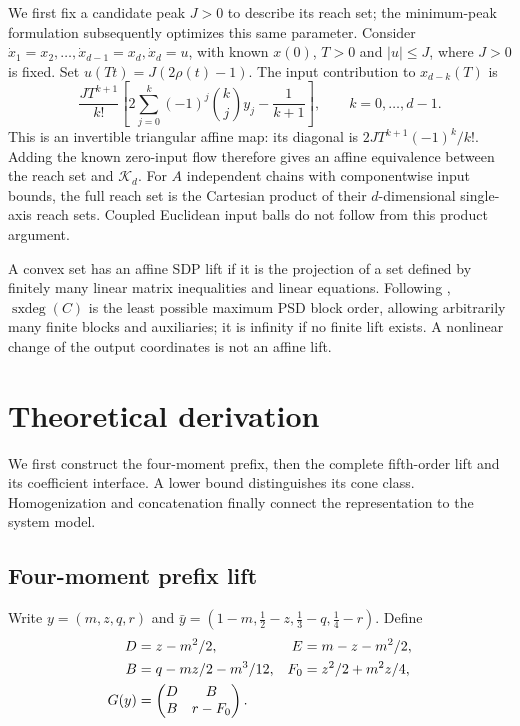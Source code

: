 \documentclass[pdflatex,sn-mathphys-num]{sn-jnl}
\theoremstyle{thmstyleone}
\theoremstyle{thmstyletwo}\newtheorem{remark}[theorem]{Remark}
\newcommand{\K}{\mathcal K}
\newcommand{\sxdeg}{\operatorname{sxdeg}}
\begin{document}
We first fix a candidate peak $J>0$ to describe its reach set; the
minimum-peak formulation subsequently optimizes this same parameter.
Consider $\dot x_1=x_2,\ldots,\dot x_{d-1}=x_d,\dot x_d=u$,
with known $x(0)$, $T>0$ and $|u|\le J$, where $J>0$ is fixed.
Set $u(Tt)=J(2\rho(t)-1)$. The input contribution to $x_{d-k}(T)$ is
\begin{equation}\label{eq:affine}
 \frac{JT^{k+1}}{k!}\left[
 2\sum_{j=0}^k(-1)^j\binom{k}{j}y_j-\frac1{k+1}\right],
 \qquad k=0,\ldots,d-1.
\end{equation}
This is an invertible triangular affine map: its diagonal is
$2JT^{k+1}(-1)^k/k!$. Adding the known zero-input flow therefore gives an
affine equivalence between the reach set and $\K_d$. For $A$ independent
chains with componentwise input bounds, the full reach set is the Cartesian
product of their $d$-dimensional single-axis reach sets. Coupled Euclidean
input balls do not follow from this product argument.

A convex set has an affine SDP lift if it is the projection of a set defined
by finitely many linear matrix inequalities and linear equations. Following
\cite{averkov}, $\sxdeg(C)$ is the least possible maximum PSD block order,
allowing arbitrarily many finite blocks and auxiliaries; it is infinity
if no finite lift exists. A nonlinear change of the output coordinates is
not an affine lift.

\section{Theoretical derivation}\label{sec:theory}
We first construct the four-moment prefix, then the complete fifth-order
lift and its coefficient interface. A lower bound distinguishes its cone
class. Homogenization and concatenation finally connect the representation
to the system model.

\subsection{Four-moment prefix lift}\label{sec:four}
Write $y=(m,z,q,r)$ and
$\bar y=(1-m,\tfrac12-z,\tfrac13-q,\tfrac14-r)$. Define
\begin{align}
 D&=z-m^2/2,& E&=m-z-m^2/2,\notag\\
 B&=q-mz/2-m^3/12,& F_0&=z^2/2+m^2z/4,\notag\\
 G(y)&=\begin{pmatrix}D&B\\B&r-F_0\end{pmatrix}.\label{eq:nonlinear}
\end{align}
\end{document}
